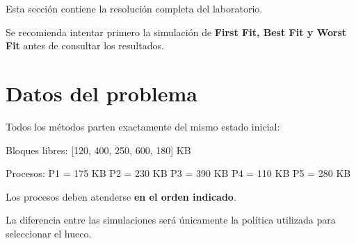 \documentclass[
  spanish,
  letterpaper,
]{scrbook}
\newenvironment{Shaded}{\begin{snugshade}}{\end{snugshade}}
\newcommand{\NormalTok}[1]{\textcolor[rgb]{0.00,0.23,0.31}{#1}}
\begin{document}
\begin{tcolorbox}[enhanced jigsaw, arc=.35mm, bottomrule=.15mm, bottomtitle=1mm, breakable, colback=white, colbacktitle=quarto-callout-warning-color!10!white, colframe=quarto-callout-warning-color-frame, coltitle=black, left=2mm, leftrule=.75mm, opacityback=0, opacitybacktitle=0.6, rightrule=.15mm, title=\textcolor{quarto-callout-warning-color}{\faExclamationTriangle}\hspace{0.5em}{Solución para publicar después de la actividad}, titlerule=0mm, toprule=.15mm, toptitle=1mm]

Esta sección contiene la resolución completa del laboratorio.

Se recomienda intentar primero la simulación de \textbf{First Fit, Best
Fit y Worst Fit} antes de consultar los resultados.

\end{tcolorbox}

\section{Datos del problema}\label{datos-del-problema}

Todos los métodos parten exactamente del mismo estado inicial:

\begin{Shaded}
\begin{Highlighting}[]
\NormalTok{Bloques libres:}
\NormalTok{[120, 400, 250, 600, 180] KB}

\NormalTok{Procesos:}
\NormalTok{P1 = 175 KB}
\NormalTok{P2 = 230 KB}
\NormalTok{P3 = 390 KB}
\NormalTok{P4 = 110 KB}
\NormalTok{P5 = 280 KB}
\end{Highlighting}
\end{Shaded}

Los procesos deben atenderse \textbf{en el orden indicado}.

La diferencia entre las simulaciones será únicamente la política
utilizada para seleccionar el hueco.
\end{document}

